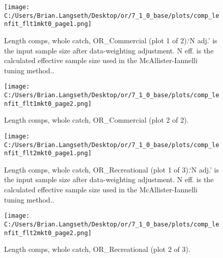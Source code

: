 \documentclass[11pt,
  english,
  a4paper,
]{article}
\begin{document}
\begin{figure}
\centering
\texttt{[image: C:/Users/Brian.Langseth/Desktop/or/7\_1\_0\_base/plots/comp\_lenfit\_flt1mkt0\_page1.png]}
\caption{Length comps, whole catch, OR\_Commercial (plot 1 of 2).`N adj.' is the input sample size after data-weighting adjustment. N eff. is the calculated effective sample size used in the McAllister-Iannelli tuning method..\label{fig:comp_lenfit_flt1mkt0_page1}}
\end{figure}

\tagmcend\tagstructend


\begin{figure}
\centering
\texttt{[image: C:/Users/Brian.Langseth/Desktop/or/7\_1\_0\_base/plots/comp\_lenfit\_flt1mkt0\_page2.png]}
\caption{Length comps, whole catch, OR\_Commercial (plot 2 of 2).\label{fig:comp_lenfit_flt1mkt0_page2}}
\end{figure}

\tagmcend\tagstructend


\begin{figure}
\centering
\texttt{[image: C:/Users/Brian.Langseth/Desktop/or/7\_1\_0\_base/plots/comp\_lenfit\_flt2mkt0\_page1.png]}
\caption{Length comps, whole catch, OR\_Recreational (plot 1 of 3).`N adj.' is the input sample size after data-weighting adjustment. N eff. is the calculated effective sample size used in the McAllister-Iannelli tuning method..\label{fig:comp_lenfit_flt2mkt0_page1}}
\end{figure}

\tagmcend\tagstructend


\begin{figure}
\centering
\texttt{[image: C:/Users/Brian.Langseth/Desktop/or/7\_1\_0\_base/plots/comp\_lenfit\_flt2mkt0\_page2.png]}
\caption{Length comps, whole catch, OR\_Recreational (plot 2 of 3).\label{fig:comp_lenfit_flt2mkt0_page2}}
\end{figure}
\end{document}
